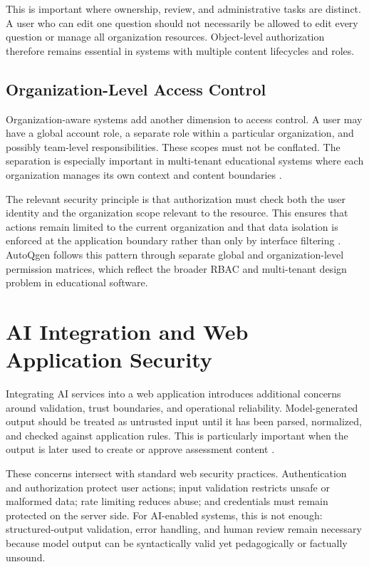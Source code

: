 This is important where ownership, review, and administrative tasks are distinct. A user who can edit one question should not necessarily be allowed to edit every question or manage all organization resources. Object-level authorization therefore remains essential in systems with multiple content lifecycles and roles.

\subsection{Organization-Level Access Control}

Organization-aware systems add another dimension to access control. A user may have a global account role, a separate role within a particular organization, and possibly team-level responsibilities. These scopes must not be conflated. The separation is especially important in multi-tenant educational systems where each organization manages its own context and content boundaries \cite{krebs2012}.

The relevant security principle is that authorization must check both the user identity and the organization scope relevant to the resource. This ensures that actions remain limited to the current organization and that data isolation is enforced at the application boundary rather than only by interface filtering \cite{owaspAccessControl,owaspApi2023}. AutoQgen follows this pattern through separate global and organization-level permission matrices, which reflect the broader RBAC and multi-tenant design problem in educational software.

\section{AI Integration and Web Application Security}

Integrating AI services into a web application introduces additional concerns around validation, trust boundaries, and operational reliability. Model-generated output should be treated as untrusted input until it has been parsed, normalized, and checked against application rules. This is particularly important when the output is later used to create or approve assessment content \cite{owaspLlm2025,nistAiRmf2023,nistGenAiProfile2024}.

These concerns intersect with standard web security practices. Authentication and authorization protect user actions; input validation restricts unsafe or malformed data; rate limiting reduces abuse; and credentials must remain protected on the server side. For AI-enabled systems, this is not enough: structured-output validation, error handling, and human review remain necessary because model output can be syntactically valid yet pedagogically or factually unsound.


